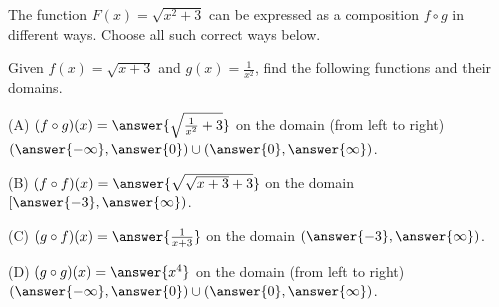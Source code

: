 \documentclass{ximera}
\author{Nela Lakos \and Kyle Parsons}
\begin{document}
\begin{exercise}

The function $F(x) = \sqrt{x^2+3}$ can be expressed as a composition $f\circ g$ in different ways.  Choose all such correct ways below.
\begin{selectAll}
\end{selectAll}

\end{exercise}

\begin{exercise}
Given $f(x) = \sqrt{x+3}$ and $g(x) = \frac{1}{x^2}$, find the following functions and their domains.

(A) $(f\circ g)(x) = \answer{\sqrt{\frac{1}{x^2}+3}}$ on the domain (from left to right) $(\answer{-\infty},\answer{0})\cup (\answer{0},\answer{\infty})$.

(B) $(f\circ f)(x) = \answer{\sqrt{\sqrt{x+3}+3}}$ on the domain $[\answer{-3},\answer{\infty})$.

(C) $(g\circ f)(x) = \answer{\frac{1}{x+3}}$ on the domain $(\answer{-3},\answer{\infty})$.

(D) $(g\circ g)(x) = \answer{x^4}$ on the domain (from left to right) $(\answer{-\infty},\answer{0})\cup(\answer{0},\answer{\infty})$.


\end{exercise}
\end{document}
